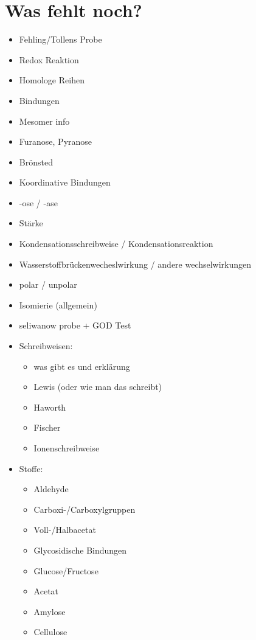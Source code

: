 
\chapter{Was fehlt noch?}
\begin{itemize}
    \item Fehling/Tollens Probe
    \item Redox Reaktion
    \item Homologe Reihen
    \item Bindungen
    \item Mesomer info
    \item Furanose, Pyranose
    \item Brönsted
    \item Koordinative Bindungen
    \item -ose / -ase
    \item Stärke
    \item Kondensationsschreibweise / Kondensationsreaktion
    \item Wasserstoffbrückenwecheslwirkung / andere wechselwirkungen
    \item polar / unpolar
    \item Isomierie (allgemein)
    \item seliwanow probe + GOD Test

    \item Schreibweisen:
    \begin{itemize}
        \item was gibt es und erklärung
        \item Lewis (oder wie man das schreibt)
        \item Haworth
        \item Fischer
        \item Ionenschreibweise
    \end{itemize}

    \item Stoffe:
    \begin{itemize}
        \item Aldehyde
        \item Carboxi-/Carboxylgruppen
        \item Voll-/Halbacetat
        \item Glycosidische Bindungen
        \item Glucose/Fructose
        \item Acetat
        \item Amylose
        \item Cellulose
    \end{itemize}
\end{itemize}

